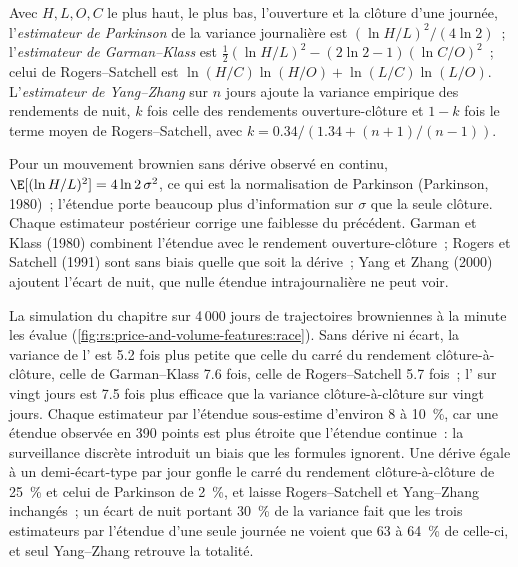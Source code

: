 \begin{definition}\label{def:rs:price-and-volume-features:estimators}
Avec $H, L, O, C$ le plus haut, le plus bas, l'ouverture et la clôture d'une journée, l'\emph{estimateur de Parkinson} de la variance journalière est
$(\ln H/L)^2/(4\ln 2)$~; l'\emph{estimateur de Garman--Klass} est $\tfrac12(\ln H/L)^2 - (2\ln 2 -
1)(\ln C/O)^2$~; celui de Rogers--Satchell est $\ln(H/C)\ln(H/O) + \ln(L/C)\ln(L/O)$. L'\emph{estimateur de
Yang--Zhang} sur $n$ jours ajoute la variance empirique des rendements de nuit, $k$ fois celle des
rendements ouverture-clôture et $1 - k$ fois le terme moyen de Rogers--Satchell, avec $k = 0.34/(1.34 + (n+1)/(n-1))$.
\end{definition}

Pour un mouvement brownien sans dérive observé en continu, $\E[(\ln H/L)^2] = 4\ln2\,\sigma^2$, ce qui est la normalisation de Parkinson
(Parkinson, 1980)~; l'étendue porte beaucoup plus d'information sur $\sigma$ que la seule clôture. Chaque estimateur postérieur corrige une
faiblesse du précédent. Garman et Klass (1980) combinent l'étendue avec le rendement ouverture-clôture~; Rogers et Satchell (1991) sont
sans biais quelle que soit la dérive~; Yang et Zhang (2000) ajoutent l'écart de nuit, que nulle étendue intrajournalière ne peut voir.

La simulation du chapitre sur 4\,000 jours de trajectoires browniennes à la minute les évalue (\cref{fig:rs:price-and-volume-features:race}).
Sans dérive ni écart, la variance de l' est 5.2 fois plus petite que celle du carré du rendement clôture-à-clôture,
celle de Garman--Klass 7.6 fois, celle de Rogers--Satchell 5.7 fois~; l' sur vingt jours est 7.5 fois plus efficace que la
variance clôture-à-clôture sur vingt jours. Chaque estimateur par l'étendue sous-estime d'environ 8 à 10~\%, car une étendue observée en 390 points est plus étroite
que l'étendue continue~: la surveillance discrète introduit un biais que les formules ignorent. Une dérive égale à un demi-écart-type par jour
gonfle le carré du rendement clôture-à-clôture de 25~\% et celui de Parkinson de 2~\%, et laisse Rogers--Satchell et Yang--Zhang inchangés~; un écart de nuit
portant 30~\% de la variance fait que les trois estimateurs par l'étendue d'une seule journée ne voient que 63 à 64~\% de celle-ci, et seul Yang--Zhang retrouve
la totalité.

